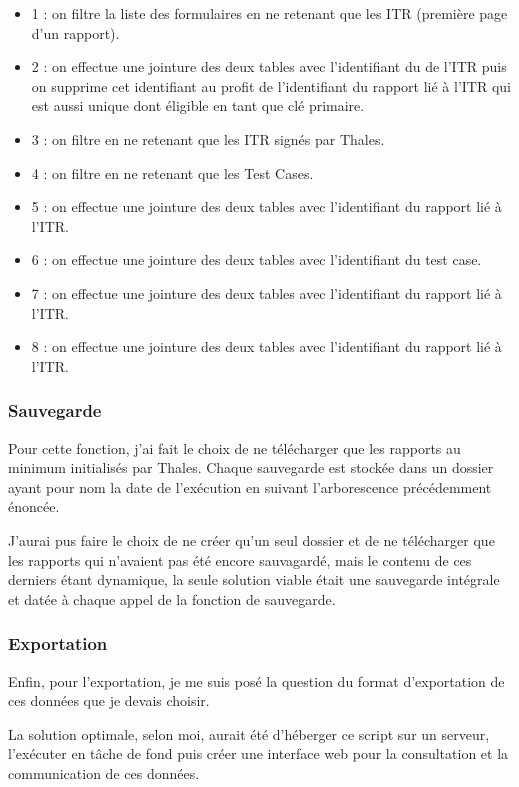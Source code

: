 \begin{itemize}
\item 1 : on filtre la liste des formulaires en ne retenant que les ITR (première page d'un rapport).
\item 2 : on effectue une jointure des deux tables avec l'identifiant du de l'ITR puis on supprime cet identifiant au profit de l'identifiant du rapport lié à l'ITR qui est aussi unique dont éligible en tant que clé primaire.
\item 3 : on filtre en ne retenant que les ITR signés par Thales.
\item 4 : on filtre en ne retenant que les Test Cases.
\item 5 : on effectue une jointure des deux tables avec l'identifiant du rapport lié à l'ITR.
\item 6 : on effectue une jointure des deux tables avec l'identifiant du test case.
\item 7 : on effectue une jointure des deux tables avec l'identifiant du rapport lié à l'ITR.
\item 8 : on effectue une jointure des deux tables avec l'identifiant du rapport lié à l'ITR.
\end{itemize}

\subsubsection{Sauvegarde}
Pour cette fonction, j'ai fait le choix de ne télécharger que les rapports au minimum initialisés par Thales. Chaque sauvegarde est stockée dans un dossier ayant pour nom la date de l'exécution en suivant l'arborescence précédemment énoncée. 

J'aurai pus faire le choix de ne créer qu'un seul dossier et de ne télécharger que les rapports qui n'avaient pas été encore sauvagardé,
mais le contenu de ces derniers étant dynamique, la seule solution viable était une sauvegarde intégrale et datée à chaque appel de la fonction de sauvegarde.
\subsubsection{Exportation}
Enfin, pour l'exportation, je me suis posé la question du format d'exportation de ces données que je devais choisir.

La solution optimale, selon moi, aurait été d'héberger ce script sur un serveur, l'exécuter en tâche de fond puis créer une interface web pour la consultation et la communication de ces données.

